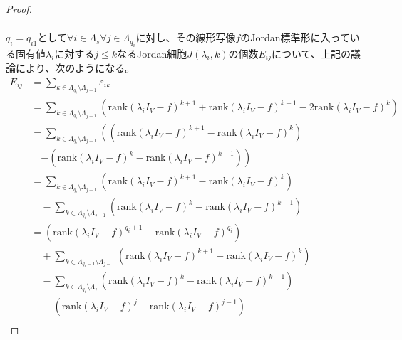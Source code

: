 \documentclass[dvipdfmx]{jsarticle}
\begin{document}
\begin{proof}
\begin{align*}
\end{align*}\par
$q_{i} = q_{i1}$として$\forall i \in \varLambda_{s}\forall j \in \varLambda_{q_{i}}$に対し、その線形写像$f$のJordan標準形に入っている固有値$\lambda_{i}$に対する$j \leq k$なるJordan細胞$J\left( \lambda_{i},k \right)$の個数$E_{ij}$について、上記の議論により、次のようになる。
\begin{align*}
E_{ij} &= \sum_{k \in \varLambda_{q_{i}} \setminus \varLambda_{j - 1}} \varepsilon_{ik}\\
&= \sum_{k \in \varLambda_{q_{i}} \setminus \varLambda_{j - 1}} \left( {\mathrm{rank}}\left( \lambda_{i}I_{V} - f \right)^{k + 1} + {\mathrm{rank}}\left( \lambda_{i}I_{V} - f \right)^{k - 1} - 2{\mathrm{rank}}\left( \lambda_{i}I_{V} - f \right)^{k} \right)\\
&= \sum_{k \in \varLambda_{q_{i}} \setminus \varLambda_{j - 1}} \left( \left( {\mathrm{rank}}\left( \lambda_{i}I_{V} - f \right)^{k + 1} - {\mathrm{rank}}\left( \lambda_{i}I_{V} - f \right)^{k} \right) \right. \\
&\quad \left. - \left( {\mathrm{rank}}\left( \lambda_{i}I_{V} - f \right)^{k} - {\mathrm{rank}}\left( \lambda_{i}I_{V} - f \right)^{k - 1} \right) \right)\\
&= \sum_{k \in \varLambda_{q_{i}} \setminus \varLambda_{j - 1}} \left( {\mathrm{rank}}\left( \lambda_{i}I_{V} - f \right)^{k + 1} - {\mathrm{rank}}\left( \lambda_{i}I_{V} - f \right)^{k} \right) \\
&\quad - \sum_{k \in \varLambda_{q_{i}} \setminus \varLambda_{j - 1}} \left( {\mathrm{rank}}\left( \lambda_{i}I_{V} - f \right)^{k} - {\mathrm{rank}}\left( \lambda_{i}I_{V} - f \right)^{k - 1} \right)\\
&= \left( {\mathrm{rank}}\left( \lambda_{i}I_{V} - f \right)^{q_{i} + 1} - {\mathrm{rank}}\left( \lambda_{i}I_{V} - f \right)^{q_{i}} \right) \\
&\quad + \sum_{k \in \varLambda_{q_{i} - 1} \setminus \varLambda_{j - 1}} \left( {\mathrm{rank}}\left( \lambda_{i}I_{V} - f \right)^{k + 1} - {\mathrm{rank}}\left( \lambda_{i}I_{V} - f \right)^{k} \right) \\
&\quad - \sum_{k \in \varLambda_{q_{i}} \setminus \varLambda_{j}} \left( {\mathrm{rank}}\left( \lambda_{i}I_{V} - f \right)^{k} - {\mathrm{rank}}\left( \lambda_{i}I_{V} - f \right)^{k - 1} \right) \\
&\quad - \left( {\mathrm{rank}}\left( \lambda_{i}I_{V} - f \right)^{j} - {\mathrm{rank}}\left( \lambda_{i}I_{V} - f \right)^{j - 1} \right)\\

\end{align*}
\end{proof}
\end{document}
